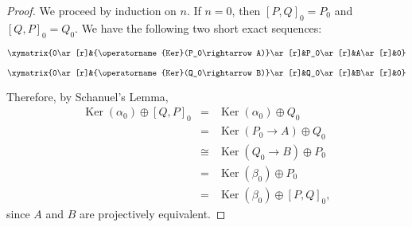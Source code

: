 \documentclass[12pt]{article}
\newcommand{\kernel}{\operatorname{Ker}}
\begin{document}
\begin{proof}
We proceed by induction on $n$.  If $n=0$, then $[P,Q]_0=P_0$ and $[Q,P]_0=Q_0$.  We have the following two short exact sequences:
\begin{center}
$\xymatrix{0\ar[r]&{\kernel(P_0\rightarrow A)}\ar[r]&P_0\ar[r]&A\ar[r]&0}$
\end{center}
\begin{center}
$\xymatrix{0\ar[r]&{\kernel(Q_0\rightarrow B)}\ar[r]&Q_0\ar[r]&B\ar[r]&0}$
\end{center}
Therefore, by Schanuel's Lemma,
\begin{eqnarray*}
\kernel(\alpha_0)\oplus[Q,P]_0&=&\kernel(\alpha_0)\oplus Q_0 \\
&=&\kernel(P_0\rightarrow A)\oplus Q_0 \\
&\cong& \kernel(Q_0\rightarrow B)\oplus P_0 \\
&=&\kernel(\beta_0)\oplus P_0 \\
&=&\kernel(\beta_0)\oplus[P,Q]_0,
\end{eqnarray*}
since $A$ and $B$ are projectively equivalent.


\end{proof}
\end{document}
